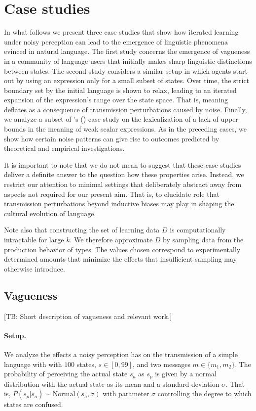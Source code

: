 \documentclass[10pt,a4paper]{article}
\newcommand{\tb}[1]{\textcolor[rgb]{.8,.33,.0}{[TB: #1]}}%
\newcommand{\citeposs}[2][]{\citeauthor{#2}'s (\citeyear[#1]{#2})}
\begin{document}
\section{Case studies}
In what follows we present three case studies that show how iterated learning under noisy perception can lead to the emergence of linguistic phenomena evinced in natural language. The first study concerns the emergence of vagueness in a community of language users that initially makes sharp linguistic distinctions between states. The second study considers a similar setup in which agents start out by using an expression only for a small subset of states. Over time, the strict boundary set by the initial language is shown to relax, leading to an iterated expansion of the expression's range over the state space. That is, meaning deflates as a consequence of transmission perturbations caused by noise. Finally, we analyze a subset of \citeposs{brochhagen+etal:2016:CogSci} case study on the lexicalization of a lack of upper-bounds in the meaning of weak scalar expressions. As in the preceding cases, we show how certain noise patterns can give rise to outcomes predicted by theoretical and empirical investigations. 

It is important to note that we do not mean to suggest that these case studies deliver a definite answer to the question how these properties arise. Instead, we restrict our attention to minimal settings that deliberately abstract away from aspects not required for our present aim. That is, to elucidate role that transmission perturbations beyond inductive biases may play in shaping the cultural evolution of language.%

Note also that constructing the set of learning data $D$ is computationally intractable for large $k$. We therefore approximate $D$ by sampling data from the production behavior of types. The values chosen correspond to experimentally determined amounts that minimize the effects that insufficient sampling may otherwise introduce. 

\subsection{Vagueness}
\tb{Short description of vagueness and relevant work.}

\paragraph{Setup.} We analyze the effects a noisy perception has on the transmission of a simple language with with $100$ states, $s \in [0,99]$, and two messages $m \in \{m_1,m_2\}$. The probability of perceiving the actual state $s_a$ as $s_p$ is given by a normal distribution with the actual state as its mean and a standard deviation $\sigma$. That is, $P(s_p | s_a) \sim \text{Normal}(s_{a},\sigma)$ with parameter $\sigma$ controlling the degree to which states are confused. 
\end{document}
